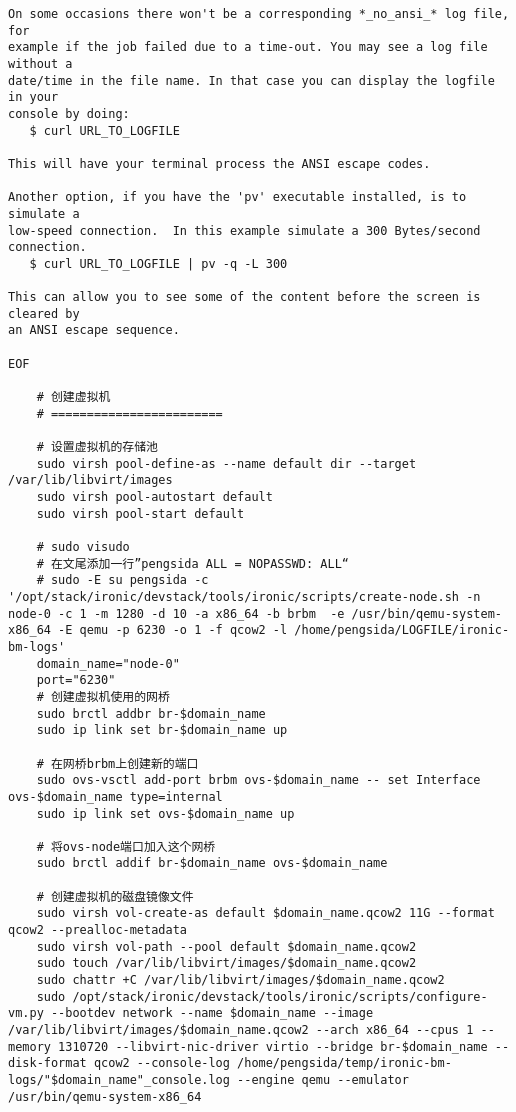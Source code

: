 \documentclass[a4paper,left=1.5cm,right=1.5cm,11pt]{article}
\begin{document}
\begin{lstlisting}
On some occasions there won't be a corresponding *_no_ansi_* log file, for
example if the job failed due to a time-out. You may see a log file without a
date/time in the file name. In that case you can display the logfile in your
console by doing:
   $ curl URL_TO_LOGFILE

This will have your terminal process the ANSI escape codes.

Another option, if you have the 'pv' executable installed, is to simulate a
low-speed connection.  In this example simulate a 300 Bytes/second connection.
   $ curl URL_TO_LOGFILE | pv -q -L 300

This can allow you to see some of the content before the screen is cleared by
an ANSI escape sequence.

EOF

	# 创建虚拟机
	# ========================

	# 设置虚拟机的存储池
	sudo virsh pool-define-as --name default dir --target /var/lib/libvirt/images
	sudo virsh pool-autostart default
	sudo virsh pool-start default

	# sudo visudo
	# 在文尾添加一行”pengsida ALL = NOPASSWD: ALL“
	# sudo -E su pengsida -c '/opt/stack/ironic/devstack/tools/ironic/scripts/create-node.sh -n node-0 -c 1 -m 1280 -d 10 -a x86_64 -b brbm  -e /usr/bin/qemu-system-x86_64 -E qemu -p 6230 -o 1 -f qcow2 -l /home/pengsida/LOGFILE/ironic-bm-logs'
	domain_name="node-0"
	port="6230"
	# 创建虚拟机使用的网桥
	sudo brctl addbr br-$domain_name
	sudo ip link set br-$domain_name up

	# 在网桥brbm上创建新的端口
	sudo ovs-vsctl add-port brbm ovs-$domain_name -- set Interface ovs-$domain_name type=internal
	sudo ip link set ovs-$domain_name up

	# 将ovs-node端口加入这个网桥
	sudo brctl addif br-$domain_name ovs-$domain_name

	# 创建虚拟机的磁盘镜像文件
	sudo virsh vol-create-as default $domain_name.qcow2 11G --format qcow2 --prealloc-metadata
	sudo virsh vol-path --pool default $domain_name.qcow2
	sudo touch /var/lib/libvirt/images/$domain_name.qcow2
	sudo chattr +C /var/lib/libvirt/images/$domain_name.qcow2
	sudo /opt/stack/ironic/devstack/tools/ironic/scripts/configure-vm.py --bootdev network --name $domain_name --image /var/lib/libvirt/images/$domain_name.qcow2 --arch x86_64 --cpus 1 --memory 1310720 --libvirt-nic-driver virtio --bridge br-$domain_name --disk-format qcow2 --console-log /home/pengsida/temp/ironic-bm-logs/"$domain_name"_console.log --engine qemu --emulator /usr/bin/qemu-system-x86_64
	

\end{lstlisting}
\end{document}
